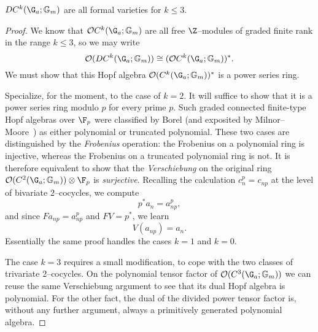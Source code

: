 \begin{lemma}\label{CkGaGmAreFVars}
\(DC^k(\G_a; \Gm)\) are all formal varieties for \(k \le 3\).
\end{lemma}
\begin{proof}
We know that \(\sheaf O C^k(\G_a; \Gm)\) are all free \(\Z\)--modules of graded finite rank in the range \(k \le 3\), so we may write \[\sheaf O(D C^k(\G_a; \Gm)) \cong (\sheaf O C^k(\G_a; \Gm))^*.\]  We must show that this Hopf algebra \(\sheaf O(C^k(\G_a; \Gm))^*\) is a power series ring.

Specialize, for the moment, to the case of \(k = 2\).  It will suffice to show that it is a power series ring modulo \(p\) for every prime \(p\).  Such graded connected finite-type Hopf algebras over \(\F_p\) were classified by Borel (and exposited by Milnor--Moore~\cite[Theorem 7.11]{MilnorMoore}) as either polynomial or truncated polynomial.  These two cases are distinguished by the \textit{Frobenius} operation: the Frobenius on a polynomial ring is injective, whereas the Frobenius on a truncated polynomial ring is not.  It is therefore equivalent to show that the \emph{Verschiebung} on the original ring \(\sheaf O(C^2(\G_a; \Gm)) \otimes \F_p\) is \emph{surjective}.  Recalling the calculation \(c_n^p = c_{np}\) at the level of bivariate \(2\)--cocycles, we compute \[p^* a_n = a_{np}^p,\] and since \(F a_{np} = a_{np}^p\) and \(FV = p^*\), we learn \[V(a_{np}) = a_n.\]  Essentially the same proof handles the cases \(k = 1\) and \(k = 0\).

The case \(k = 3\) requires a small modification, to cope with the two classes of trivariate \(2\)--cocycles.  On the polynomial tensor factor of \(\sheaf O(C^3(\G_a; \Gm))\) we can reuse the same Verschiebung argument to see that its dual Hopf algebra is polynomial.  For the other fact, the dual of the divided power tensor factor is, without any further argument, always a primitively generated polynomial algebra.
\end{proof}

